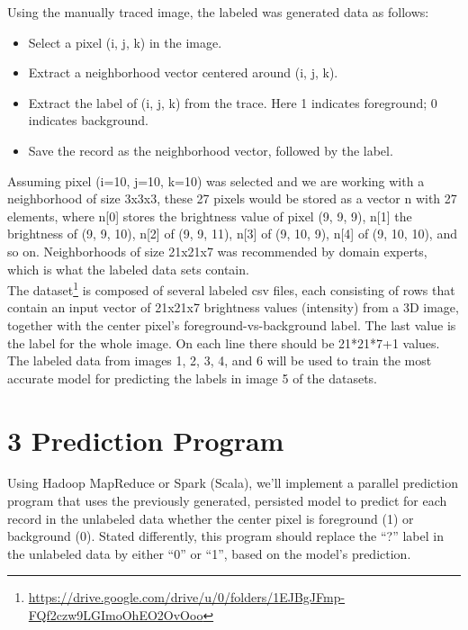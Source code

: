 \documentclass{neu_handout}
\begin{document}
Using the manually traced image, the labeled was generated data as follows:

\newenvironment{myitemize}
{ \begin{itemize}
    \setlength{\itemsep}{0pt}
    \setlength{\parskip}{0pt}
    \setlength{\parsep}{0pt}     }
{ \end{itemize}                  } 

\begin{myitemize}
  \item Select a pixel (i, j, k) in the image.
  \item Extract a neighborhood vector centered around (i, j, k).
  \item Extract the label of (i, j, k) from the trace. Here 1 indicates foreground; 0 indicates background.
  \item  Save the record as the neighborhood vector, followed by the label.
\end{myitemize}

Assuming pixel (i=10, j=10, k=10) was selected and we are working with a neighborhood of size 3x3x3, these 27 pixels would be stored as a vector n with 27 elements, where n[0] stores the brightness value of
pixel (9, 9, 9), n[1] the brightness of (9, 9, 10), n[2] of (9, 9, 11), n[3] of (9, 10, 9), n[4] of (9, 10, 10), and so on. Neighborhoods of size 21x21x7 was recommended by domain experts, which is what the labeled data sets contain.\\

The dataset\footnote{\url{https://drive.google.com/drive/u/0/folders/1EJBgJFmp-FQf2czw9LGImoOhEO2OvOoo}} is composed of several labeled csv files, each consisting of rows that contain an input vector of 21x21x7
brightness values (intensity) from a 3D image, together with the center pixel’s foreground-vs-background label. The last value is the label for the whole image. On each line there should be 21*21*7+1 values. The labeled data from images 1, 2, 3, 4, and 6 will be used to train the most accurate model for predicting the labels in image 5 of the datasets.

\section*{3 Prediction Program}
Using Hadoop MapReduce or Spark (Scala), we'll implement a parallel prediction program that uses the previously generated, persisted model to predict for each record in the unlabeled data whether the center pixel is foreground (1) or background (0). Stated differently, this program should replace the “?” label in the unlabeled data by either “0” or “1”, based on the model’s prediction.
\end{document}
